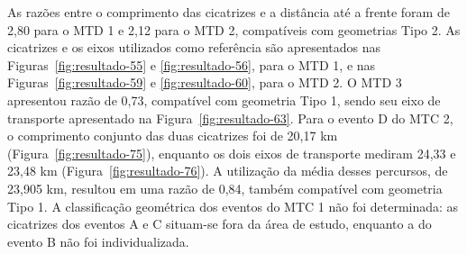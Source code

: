 As razões entre o comprimento das cicatrizes e a distância até a frente foram de 2,80 para o MTD 1 e 2,12 para o MTD 2, compatíveis com geometrias Tipo 2. As cicatrizes e os eixos utilizados como referência são apresentados nas Figuras~\ref{fig:resultado-55} e \ref{fig:resultado-56}, para o MTD 1, e nas Figuras~\ref{fig:resultado-59} e \ref{fig:resultado-60}, para o MTD 2. O MTD 3 apresentou razão de 0,73, compatível com geometria Tipo 1, sendo seu eixo de transporte apresentado na Figura~\ref{fig:resultado-63}. Para o evento D do MTC 2, o comprimento conjunto das duas cicatrizes foi de 20,17 km (Figura~\ref{fig:resultado-75}), enquanto os dois eixos de transporte mediram 24,33 e 23,48 km (Figura~\ref{fig:resultado-76}). A utilização da média desses percursos, de 23,905 km, resultou em uma razão de 0,84, também compatível com geometria Tipo 1. A classificação geométrica dos eventos do MTC 1 não foi determinada: as cicatrizes dos eventos A e C situam-se fora da área de estudo, enquanto a do evento B não foi individualizada.

